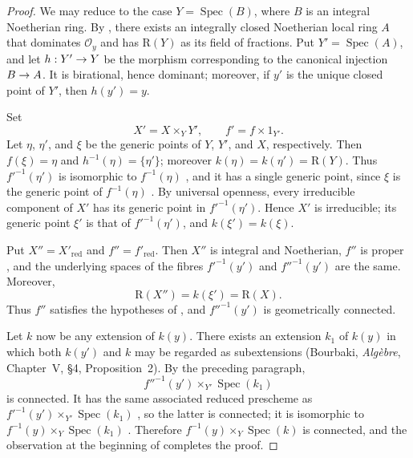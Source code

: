 \documentclass[oneside]{amsart}
\theoremstyle{ega-env-style}
\theoremstyle{ega-thm-env-style}
\theoremstyle{ega-defn-env-style}
\def\mathcal{\mathscr}
\def\sh{\mathcal}                   %
\def\kres{k}                        %
\def\Spec{\operatorname{Spec}}
\renewcommand{\to}{\mathchoice{\longrightarrow}{\rightarrow}{\rightarrow}{\rightarrow}}
\newcommand{\oldpage}[2][]{{\marginnote{\normalfont{\textbf{#1}~|~#2}}}\ignorespaces}
\begin{document}
\begin{proof}
We may reduce to the case $Y=\Spec(B)$, where $B$ is an integral
Noetherian ring.  By , there exists an integrally
closed Noetherian local ring $A$ that dominates $\sh{O}_y$ and has
$\mathrm{R}(Y)$ as its field of fractions.  Put $Y'=\Spec(A)$, and let
$h:Y'\to Y$ be the morphism corresponding to the canonical
injection $B\to A$.  It is birational, hence dominant; moreover, if
$y'$ is the unique closed point of $Y'$, then $h(y')=y$.

Set
\[
  X'=X\times_Y Y',
  \qquad
  f'=f\times 1_{Y'}.
\]
Let $\eta$, $\eta'$, and $\xi$ be the generic points of $Y$, $Y'$,
and $X$, respectively.  Then $f(\xi)=\eta$ and
$h^{-1}(\eta)=\{\eta'\}$; moreover
$\kres(\eta)=\kres(\eta')=\mathrm{R}(Y)$.  Thus $f'^{-1}(\eta')$ is
isomorphic to $f^{-1}(\eta)$ , and it has a single
generic point, since $\xi$ is the generic point of
$f^{-1}(\eta)$ .  By universal openness, every
irreducible component of $X'$ has its generic point in
$f'^{-1}(\eta')$.  Hence $X'$ is irreducible; its generic point
$\xi'$ is that of $f'^{-1}(\eta')$, and
$\kres(\xi')=\kres(\xi)$.

\oldpage[III]{134}

Put $X''=X'_{\mathrm{red}}$ and $f''=f'_{\mathrm{red}}$.  Then
$X''$ is integral and Noetherian, $f''$ is proper
, and the underlying spaces of the fibres
$f'^{-1}(y')$ and $f''^{-1}(y')$ are the same.  Moreover,
\[
  \mathrm{R}(X'')=\kres(\xi')=\mathrm{R}(X).
\]
Thus $f''$ satisfies the hypotheses of , and
$f''^{-1}(y')$ is geometrically connected.

Let $k$ now be any extension of $\kres(y)$.  There exists an
extension $k_1$ of $\kres(y)$ in which both $\kres(y')$ and $k$ may
be regarded as subextensions (Bourbaki, \emph{Alg\`ebre},
Chapter~V, \S4, Proposition~2).  By the preceding paragraph,
\[
  f''^{-1}(y')\times_{Y'}\Spec(k_1)
\]
is connected.  It has the same associated reduced prescheme as
$f'^{-1}(y')\times_{Y'}\Spec(k_1)$
, so the latter is connected; it is isomorphic to
$f^{-1}(y)\times_Y\Spec(k_1)$ .  Therefore
$f^{-1}(y)\times_Y\Spec(k)$ is connected, and the observation at the
beginning of  completes the proof.
\end{proof}
\end{document}
